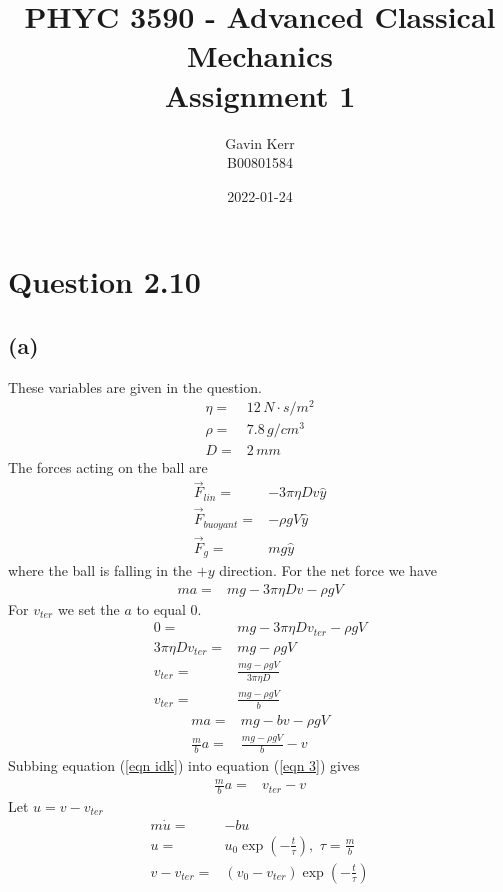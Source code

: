 \documentclass[12pt, a4paper]{article}
\title{PHYC 3590 - Advanced Classical Mechanics\\Assignment 1}
\author{Gavin Kerr\\B00801584}
\date{2022-01-24}
\begin{document}
\maketitle


\section*{Question 2.10}
\subsection*{(a)}
These variables are given in the question.
\begin{align*}
\eta =& 12 \, N\cdot s/m^2
\\
\rho =& 7.8 \, g/cm^3
\\
D =& 2 \, mm
\end{align*}
The forces acting on the ball are 
\begin{align*}
\vec{F}_{lin} =& - 3\pi \eta D v\hat{y}
\\
\vec{F}_{buoyant} =& -\rho g V \hat{y}
\\
\vec{F}_{g} =& mg\hat{y}
\end{align*}
where the ball is falling in the $+y$ direction. For the net force we have
\begin{align*}
ma =& mg - 3 \pi \eta D v - \rho g V   
\end{align*}
For $v_{ter}$ we set the $a$ to equal $0$.
\begin{align}
0 =& mg - 3 \pi \eta D v_{ter} - \rho g V  
\\
3 \pi \eta D v_{ter} =& mg - \rho gV 
\\
v_{ter} =& \frac{mg - \rho gV}{3 \pi \eta D}
\\
v_{ter} =& \frac{mg - \rho gV}{b} \label{eqn idk}
\end{align}
\begin{align}
ma =& mg - b v - \rho g V   
\\
\frac{m}{b}a =& \frac{mg - \rho gV}{b}   -  v \label{eqn 3}
\end{align}
Subbing equation (\ref{eqn idk}) into equation (\ref{eqn 3}) gives
\begin{align*}
\frac{m}{b}a =& v_{ter} -  v
\end{align*}
Let $u = v - v_{ter}$
\begin{align*}
m\dot{u} =& -bu
\\
u =& u_0 \exp \left( -\frac{t}{\tau} \right), \,\, \tau = \frac{m}{b}
\\
v - v_{ter} =& (v_0 - v_{ter})\exp \left( -\frac{t}{\tau} \right)
\end{align*}
\end{document}

